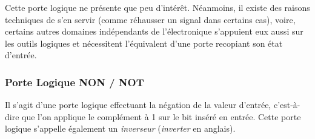 \documentclass[11pt,a4paper]{article}
\begin{document}
Cette porte logique ne présente que peu d'intérêt.
Néanmoins, il existe des raisons techniques de s'en servir (comme réhausser un signal dans certains cas), voire, certains autres domaines indépendants de l'électronique s'appuient eux aussi sur les outils logiques et nécessitent l'équivalent d'une porte recopiant son état d'entrée.

\medskip


\vfillLast

\subsubsection{Porte Logique NON / NOT}

Il s'agit d'une porte logique effectuant la négation de la valeur d'entrée, c'est-à-dire que l'on applique le complément à 1 sur le bit inséré en entrée.
Cette porte logique s'appelle également un \textit{inverseur} (\textit{inverter} en anglais).

\medskip
\end{document}
